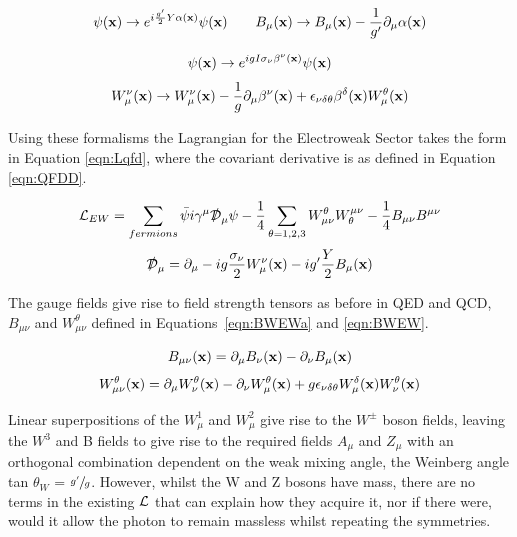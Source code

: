 \begin{equation}
\psi(\mathbf{x}) \rightarrow e^{i\frac{g'}{2}Y\alpha (\mathbf{x})}\psi(\mathbf{x}) \qquad B_{\mu}(\mathbf{x}) \rightarrow B_{\mu}(\mathbf{x}) - \frac{1}{g'}\partial_{\mu}\alpha(\mathbf{x})
\label{eqn:ewu1}
\end{equation}

\begin{equation}
\psi(\mathbf{x}) \rightarrow e^{igI\sigma_{\nu} \beta^{\nu} (\mathbf{x})}\psi(\mathbf{x})
\label{eqn:ewsu2}
\end{equation}
\begin{equation}
W_{\mu}^{\nu}(\mathbf{x}) \rightarrow W_{\mu}^{\nu}(\mathbf{x}) - \frac{1}{g}\partial_{\mu}\beta^{\nu}(\mathbf{x}) + \epsilon_{\nu \delta \theta}\beta^{\delta}(\mathbf{x})W_{\mu}^{\theta}(\mathbf{x})
\label{eqn:ewsu3}
\end{equation}

Using these formalisms the Lagrangian for the Electroweak Sector takes the form in Equation \ref{eqn:Lqfd}, where the covariant derivative is as defined in Equation \ref{eqn:QFDD}. 

\begin{equation}
{\mathcal{L}}_{EW} = \sum_{fermions} \bar{\psi}i\gamma^{\mu}\slashed{\mathcal{D}}_{\mu}\psi - \frac{1}{4}\sum_{\theta = 1,2,3} W^{\theta}_{\mu\nu}W_{\theta}^{\mu\nu} - \frac{1}{4}B_{\mu\nu}B^{\mu\nu}
\label{eqn:Lqfd}
\end{equation}
\begin{equation}
\slashed{\mathcal{D}}_{\mu} = \partial_{\mu}-ig\frac{\sigma_{\nu}}{2}W_{\mu}^{\nu}(\mathbf{x}) - ig'\frac{Y}{2}B_{\mu}(\mathbf{x})
\label{eqn:QFDD}
\end{equation}

The gauge fields give rise to field strength tensors as before in QED and QCD, $B_{\mu\nu}$ and $W_{\mu\nu}^{\theta}$ defined in Equations~\ref{eqn:BWEWa} and \ref{eqn:BWEW}. 

\begin{equation}
B_{\mu\nu}(\mathbf{x}) = \partial_{\mu}B_{\nu}(\mathbf{x}) - \partial_{\nu}B_{\mu}(\mathbf{x})
\label{eqn:BWEWa}
\end{equation}
\begin{equation}
W_{\mu\nu}^{\theta}(\mathbf{x}) = \partial_{\mu}W_{\nu}^{\theta}(\mathbf{x}) - \partial_{\nu}W_{\mu}^{\theta}(\mathbf{x}) + g\epsilon_{\nu \delta \theta}W_{\mu}^{\delta}(\mathbf{x})W_{\nu}^{\theta}(\mathbf{x})
\label{eqn:BWEW}
\end{equation}

Linear superpositions of the $W^{1}_{\mu}$ and $W^{2}_{\mu}$ give rise to the $W^{\pm}$ boson fields, leaving the $W^{3}$ and B fields to give rise to the required fields $A_{\mu}$ and $Z_{\mu}$ with an orthogonal combination dependent on the weak mixing angle, the Weinberg angle tan $\theta_{W}$ = $\sfrac{g'}{g}$. However, whilst the W and Z bosons have mass, there are no terms in the existing ${\mathcal{L}}$ that can explain how they acquire it, nor if there were, would it allow the photon to remain massless whilst repeating the symmetries. 

